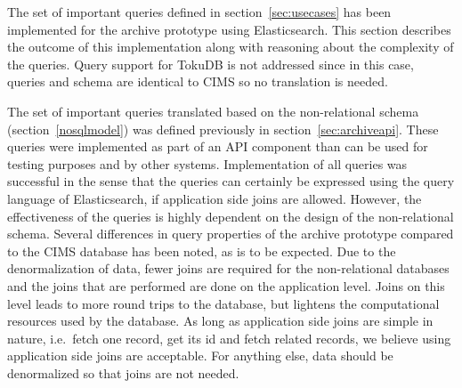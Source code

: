 The set of important queries defined in section~\ref{sec:usecases} has been implemented for the archive prototype using Elasticsearch. This section describes the outcome of this implementation along with reasoning about the complexity of the queries. Query support for TokuDB is not addressed since in this case, queries and schema are identical to CIMS so no translation is needed.

The set of important queries translated based on the non-relational schema (section~\ref{nosqlmodel}) was defined previously in section~\ref{sec:archiveapi}. These queries were implemented as part of an API component than can be used for testing purposes and by other systems. Implementation of all queries was successful in the sense that the queries can certainly be expressed using the query language of Elasticsearch, if application side joins are allowed. However, the effectiveness of the queries is highly dependent on the design of the non-relational schema. Several differences in query properties of the archive prototype compared to the CIMS database has been noted, as is to be expected. Due to the denormalization of data, fewer joins are required for the non-relational databases and the joins that are performed are done on the application level. Joins on this level leads to more round trips to the database, but lightens the computational resources used by the database. As long as application side joins are simple in nature, i.e.\ fetch one record, get its id and fetch related records, we believe using application side joins are acceptable. For anything else, data should be denormalized so that joins are not needed.



%

